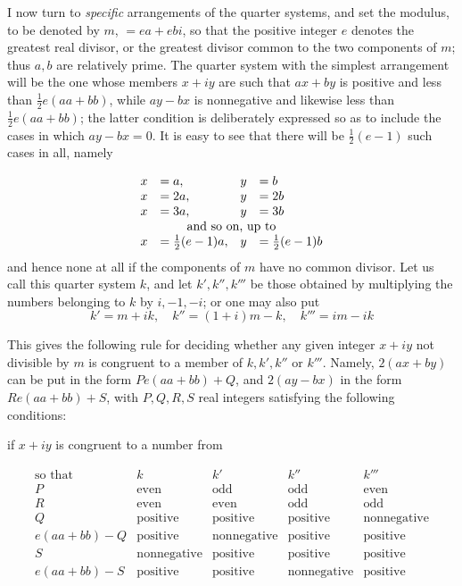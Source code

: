 I now turn to \emph{specific} arrangements of the quarter systems, and set the modulus, to be denoted by $m$, $=ea+ebi$, so that the positive integer $e$ denotes the greatest real divisor, or the greatest divisor common to the two components of $m$; thus $a,b$ are relatively prime. The quarter system with the simplest arrangement will be the one whose members $x+iy$ are such that $ax+by$ is positive and less than $\frac12e(aa+bb)$, while $ay-bx$ is nonnegative and likewise less than $\frac12e(aa+bb)$; the latter condition is deliberately expressed so as to include the cases in which $ay-bx=0$. It is easy to see that there will be $\frac12(e-1)$ such cases in all, namely

\[
\begin{array}{rlrl}
x&=a,&y&=b\\
x&=2a,&y&=2b\\
x&=3a,&y&=3b\\
\multicolumn{4}{c}{\text{and so on, up to}}\\
x&=\frac12(e-1)a,&y&=\frac12(e-1)b
\end{array}
\]
and hence none at all if the components of $m$ have no common divisor.
Let us call this quarter system $k$, and let $k',k'',k'''$ be those obtained by multiplying the numbers belonging to $k$ by $i,-1,-i$; or one may also put
\[
k'=m+ik,\quad k''=(1+i)m-k,\quad k'''=im-ik
\]

This gives the following rule for deciding whether any given integer $x+iy$ not divisible by $m$ is congruent to a member of $k,k',k''$ or $k'''$. Namely, $2(ax+by)$ can be put in the form $Pe(aa+bb)+Q$, and $2(ay-bx)$ in the form $Re(aa+bb)+S$, with $P,Q,R,S$ real integers satisfying the following conditions:

\begin{center}if $x+iy$ is congruent to a number from\end{center}
\begingroup\small\setlength{\arraycolsep}{3pt}
\[
\begin{array}{l||l|l|l|l}
\text{so that}&k&k'&k''&k'''\\
P&\text{even}&\text{odd}&\text{odd}&\text{even}\\
R&\text{even}&\text{even}&\text{odd}&\text{odd}\\
Q&\text{positive}&\text{positive}&\text{positive}&\text{nonnegative}\\
e(aa+bb)-Q&\text{positive}&\text{nonnegative}&\text{positive}&\text{positive}\\
S&\text{nonnegative}&\text{positive}&\text{positive}&\text{positive}\\
e(aa+bb)-S&\text{positive}&\text{positive}&\text{nonnegative}&\text{positive}
\end{array}
\]
\endgroup

